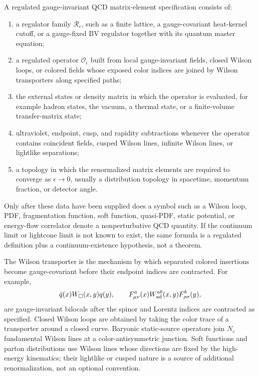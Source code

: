 \begin{definition}
\label{def:qcd-regulated-matrix-element-specification}
A regulated gauge-invariant QCD matrix-element specification consists of:
\begin{enumerate}
  \item a regulator family \(\mathcal R_\epsilon\), such as a finite lattice,
  a gauge-covariant heat-kernel cutoff, or a gauge-fixed BV regulator together
  with its quantum master equation;
  \item a regulated operator \(\mathcal O_\epsilon\) built from local
  gauge-invariant fields, closed Wilson loops, or colored fields whose exposed
  color indices are joined by Wilson transporters along specified paths;
  \item the external states or density matrix in which the operator is
  evaluated, for example hadron states, the vacuum, a thermal state, or a
  finite-volume transfer-matrix state;
  \item ultraviolet, endpoint, cusp, and rapidity subtractions whenever the
  operator contains coincident fields, cusped Wilson lines, infinite Wilson
  lines, or lightlike separations;
  \item a topology in which the renormalized matrix elements are required to
  converge as \(\epsilon\to0\), usually a distribution topology in spacetime,
  momentum fraction, or detector angle.
\end{enumerate}
Only after these data have been supplied does a symbol such as a Wilson loop,
PDF, fragmentation function, soft function, quasi-PDF, static potential, or
energy-flow correlator denote a nonperturbative QCD quantity.  If the
continuum limit or lightcone limit is not known to exist, the same formula is a
regulated definition plus a continuum-existence hypothesis, not a theorem.
\end{definition}

The Wilson transporter is the mechanism by which separated colored insertions
become gauge-covariant before their endpoint indices are contracted.  For
example,
\[
  \bar q(x)W_{\square}(x,y)q(y),\qquad
  F^a_{\mu\nu}(x)W_{\rm ad}^{ab}(x,y)F^b_{\rho\sigma}(y),
\]
are gauge-invariant bilocals after the spinor and Lorentz indices are
contracted as specified.  Closed Wilson loops are obtained by taking the color
trace of a transporter around a closed curve.  Baryonic static-source
operators join \(N_c\) fundamental Wilson lines at a color-antisymmetric
junction.  Soft functions and parton distributions use Wilson lines whose
directions are fixed by the high-energy kinematics; their lightlike or cusped
nature is a source of additional renormalization, not an optional convention.


